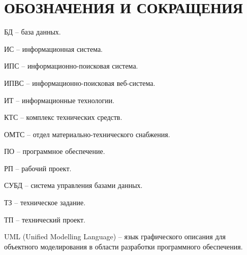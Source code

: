 \newsection
\section*{ОБОЗНАЧЕНИЯ И СОКРАЩЕНИЯ}

БД -- база данных.

ИС -- информационная система.

ИПС -- информационно-поисковая система.

ИПВС -- информационно-поисковая веб-система.

ИТ -- информационные технологии. 

КТС -- комплекс технических средств.

ОМТС -- отдел материально-технического снабжения. 

ПО -- программное обеспечение.

РП -- рабочий проект.

СУБД -- система управления базами данных.

ТЗ -- техническое задание.

ТП -- технический проект.

UML (Unified Modelling Language) -- язык графического описания для объектного моделирования в области разработки программного обеспечения.
